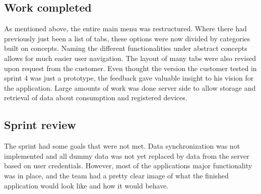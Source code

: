 \subsection{Work completed}
As mentioned above, the entire main menu was restructured. Where there had previously just been a list of tabs, these options were now divided by categories built on concepts. Naming the different functionalities under abstract concepts allows for much easier user navigation. The layout of many tabs were also revised upon request from the customer. Even thought the version the customer tested in sprint 4 was just a prototype, the feedback gave valuable insight to his vision for the application. 	Large amounts of work was done server side to allow storage and retrieval of data about consumption and registered devices. 

\subsection{Sprint review}
The sprint had some goals that were not met. Data synchronization was not implemented and all dummy data was not yet replaced by data from the server based on user credentials. However, most of the applications major functionality was in place, and the team had a pretty clear image of what the finished application would look like and how it would behave.